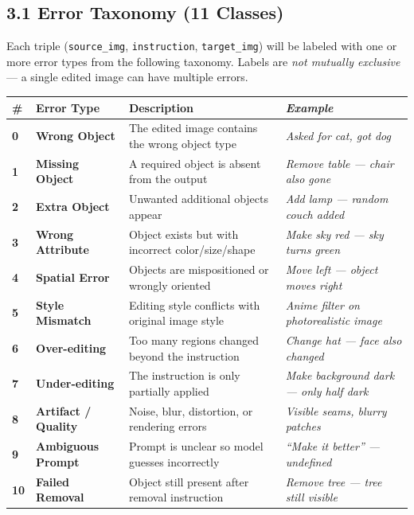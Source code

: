 \documentclass[11pt,a4paper]{article}
\begin{document}
\subsection{3.1 Error Taxonomy (11 Classes)}

Each triple (\texttt{source\_img}, \texttt{instruction}, \texttt{target\_img}) will be labeled with one or more error types from the following taxonomy. Labels are \textit{not mutually exclusive} — a single edited image can have multiple errors.

\vspace{6pt}
\begin{tabularx}{\textwidth}{>{\centering\bfseries}p{0.5cm} >{\bfseries}p{3.2cm} X >{\itshape}p{4cm}}
\toprule
\textbf{\#} & \textbf{Error Type} & \textbf{Description} & \textbf{Example} \\
\midrule
0 & Wrong Object & The edited image contains the wrong object type & Asked for cat, got dog \\
\rowcolor{lightgray}
1 & Missing Object & A required object is absent from the output & Remove table — chair also gone \\
2 & Extra Object & Unwanted additional objects appear & Add lamp — random couch added \\
\rowcolor{lightgray}
3 & Wrong Attribute & Object exists but with incorrect color/size/shape & Make sky red — sky turns green \\
4 & Spatial Error & Objects are mispositioned or wrongly oriented & Move left — object moves right \\
\rowcolor{lightgray}
5 & Style Mismatch & Editing style conflicts with original image style & Anime filter on photorealistic image \\
6 & Over-editing & Too many regions changed beyond the instruction & Change hat — face also changed \\
\rowcolor{lightgray}
7 & Under-editing & The instruction is only partially applied & Make background dark — only half dark \\
8 & Artifact / Quality & Noise, blur, distortion, or rendering errors & Visible seams, blurry patches \\
\rowcolor{lightgray}
9 & Ambiguous Prompt & Prompt is unclear so model guesses incorrectly & ``Make it better'' — undefined \\
10 & Failed Removal & Object still present after removal instruction & Remove tree — tree still visible \\
\bottomrule
\end{tabularx}
\end{document}
